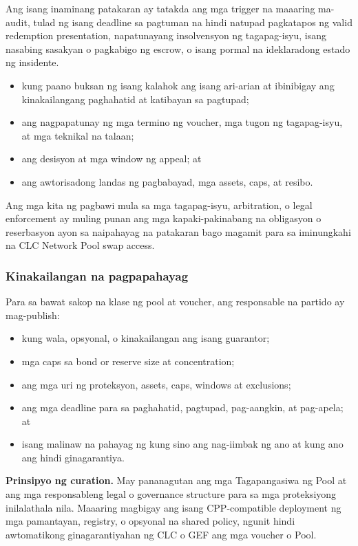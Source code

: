 \documentclass[11pt]{article}
\begin{document}
Ang isang inaminang patakaran ay tatakda ang mga trigger na maaaring ma-audit, tulad ng isang deadline sa pagtuman na hindi natupad pagkatapos ng valid redemption presentation, napatunayang insolvensyon ng tagapag-isyu, isang nasabing sasakyan o pagkabigo ng escrow, o isang pormal na ideklaradong estado ng insidente.

\begin{itemize}[leftmargin=*]
\item kung paano buksan ng isang kalahok ang isang ari-arian at ibinibigay ang kinakailangang paghahatid at katibayan sa pagtupad;
\item ang nagpapatunay ng mga termino ng voucher, mga tugon ng tagapag-isyu, at mga teknikal na talaan;
\item ang desisyon at mga window ng appeal; at
\item ang awtorisadong landas ng pagbabayad, mga assets, caps, at resibo.
\end{itemize}
Ang mga kita ng pagbawi mula sa mga tagapag-isyu, arbitration, o legal enforcement ay muling punan ang mga kapaki-pakinabang na obligasyon o reserbasyon ayon sa naipahayag na patakaran bago magamit para sa iminungkahi na CLC Network Pool swap access.

\subsubsection*{Kinakailangan na pagpapahayag}

Para sa bawat sakop na klase ng pool at voucher, ang responsable na partido ay mag-publish:

\begin{itemize}[leftmargin=*]
\item kung wala, opsyonal, o kinakailangan ang isang guarantor;
\item mga caps sa bond or reserve size at concentration;
\item ang mga uri ng proteksyon, assets, caps, windows at exclusions;
\item ang mga deadline para sa paghahatid, pagtupad, pag-aangkin, at pag-apela; at
\item isang malinaw na pahayag ng kung sino ang nag-iimbak ng ano at kung ano ang hindi ginagarantiya.
\end{itemize}
\textbf{Prinsipyo ng curation.} May pananagutan ang mga Tagapangasiwa ng Pool at ang mga responsableng legal o governance structure para sa mga proteksiyong inilalathala nila. Maaaring magbigay ang isang CPP-compatible deployment ng mga pamantayan, registry, o opsyonal na shared policy, ngunit hindi awtomatikong ginagarantiyahan ng CLC o GEF ang mga voucher o Pool.
\end{document}

